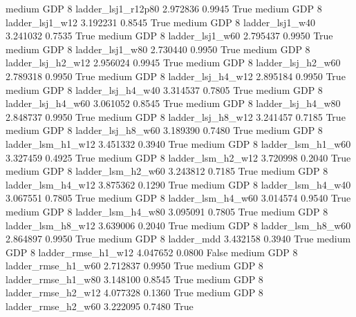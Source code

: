     medium      GDP                 8     ladder_lsj1_r12p80   2.972836      0.9945    True
    medium      GDP                 8        ladder_lsj1_w12   3.192231      0.8545    True
    medium      GDP                 8        ladder_lsj1_w40   3.241032      0.7535    True
    medium      GDP                 8        ladder_lsj1_w60   2.795437      0.9950    True
    medium      GDP                 8        ladder_lsj1_w80   2.730440      0.9950    True
    medium      GDP                 8      ladder_lsj_h2_w12   2.956024      0.9945    True
    medium      GDP                 8      ladder_lsj_h2_w60   2.789318      0.9950    True
    medium      GDP                 8      ladder_lsj_h4_w12   2.895184      0.9950    True
    medium      GDP                 8      ladder_lsj_h4_w40   3.314537      0.7805    True
    medium      GDP                 8      ladder_lsj_h4_w60   3.061052      0.8545    True
    medium      GDP                 8      ladder_lsj_h4_w80   2.848737      0.9950    True
    medium      GDP                 8      ladder_lsj_h8_w12   3.241457      0.7185    True
    medium      GDP                 8      ladder_lsj_h8_w60   3.189390      0.7480    True
    medium      GDP                 8      ladder_lsm_h1_w12   3.451332      0.3940    True
    medium      GDP                 8      ladder_lsm_h1_w60   3.327459      0.4925    True
    medium      GDP                 8      ladder_lsm_h2_w12   3.720998      0.2040    True
    medium      GDP                 8      ladder_lsm_h2_w60   3.243812      0.7185    True
    medium      GDP                 8      ladder_lsm_h4_w12   3.875362      0.1290    True
    medium      GDP                 8      ladder_lsm_h4_w40   3.067551      0.7805    True
    medium      GDP                 8      ladder_lsm_h4_w60   3.014574      0.9540    True
    medium      GDP                 8      ladder_lsm_h4_w80   3.095091      0.7805    True
    medium      GDP                 8      ladder_lsm_h8_w12   3.639006      0.2040    True
    medium      GDP                 8      ladder_lsm_h8_w60   2.864897      0.9950    True
    medium      GDP                 8             ladder_mdd   3.432158      0.3940    True
    medium      GDP                 8     ladder_rmse_h1_w12   4.047652      0.0800   False
    medium      GDP                 8     ladder_rmse_h1_w60   2.712837      0.9950    True
    medium      GDP                 8     ladder_rmse_h1_w80   3.148100      0.8545    True
    medium      GDP                 8     ladder_rmse_h2_w12   4.077328      0.1360    True
    medium      GDP                 8     ladder_rmse_h2_w60   3.222095      0.7480    True
